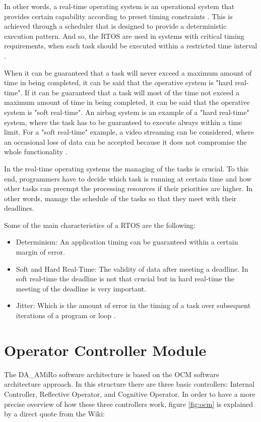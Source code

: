 \documentclass[12pt]{report}%
\begin{document}
In other words, a real-time operating system is an operational system that provides certain capability according to preset timing constraints \cite{whatisRTOS}. This is achieved through a scheduler that is designed to provide a deterministic execution pattern. And so, the RTOS are used in systems with critical timing requirements, when each task should be executed within a restricted time interval \cite{whatisRTOS}.

When it can be guaranteed that a task will never exceed a maximum amount of time in being completed, it can be said that the operative system is "hard real-time". If it can be guaranteed that a task will most of the time not exceed a maximum amount of time in being completed, it can be said that the operative system is "soft real-time". An airbag system is an example of a "hard real-time" system, where the task has to be guaranteed to execute always within a time limit. For a "soft real-time" example, a video streaming can be considered, where an occasional loss of data can be accepted because it does not compromise the whole functionality \cite{rtos}.

In the real-time operating systems the managing of the tasks is crucial. To this end, programmers have to decide which task is running at certain time and how other tasks can preempt the processing resources if their priorities are higher. In other words, manage the schedule of the tasks so that they meet with their deadlines.

Some of the main characteristics of a RTOS are the following:

\begin{itemize}
\item Determinism: An application timing can be guaranteed within a certain margin of error.
\item Soft and Hard Real-Time: The validity of data after meeting a deadline. In soft real-time the deadline is not that crucial but in hard real-time the meeting of the deadline is very important.
\item Jitter: Which is the amount of error in the timing of a task over subsequent iterations of a program or loop \cite{whatisRTOS}.
\end{itemize}

\section{Operator Controller Module}

The DA\_AMiRo software architecture is based on the OCM \cite{ocmAuto} software architecture approach. In this structure there are three basic controllers: Internal Controller, Reflective Operator, and Cognitive Operator. In order to have a more precise overview of how these three controllers work, figure \ref{fig:ocm} is explained by a direct quote from the Wiki:
\end{document}
